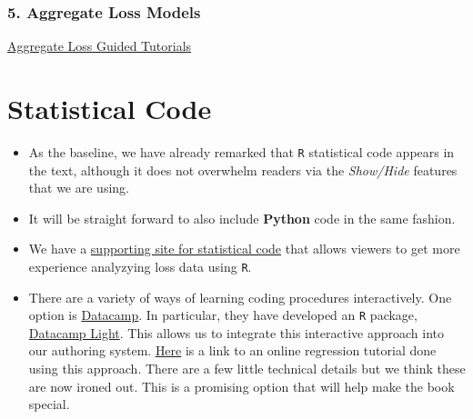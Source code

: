 \documentclass[
]{book}
\begin{document}
\hypertarget{aggregate-loss-models}{%
\subsection{5. Aggregate Loss Models}\label{aggregate-loss-models}}

\href{https://www.ssc.wisc.edu/~jfrees/loss-data-analytics/aggregate-loss-guided-tutorials/}{Aggregate Loss Guided Tutorials}

\hypertarget{S:StatisticalCode}{%
\chapter{Statistical Code}\label{S:StatisticalCode}}

\begin{itemize}
\item
  As the baseline, we have already remarked that \texttt{R} statistical code appears in the text, although it does not overwhelm readers via the \emph{Show/Hide} features that we are using.
\item
  It will be straight forward to also include \textbf{Python} code in the same fashion.
\item
  We have a \href{https://ewfrees.github.io/LDARcode/index.html}{supporting site for statistical code} that allows viewers to get more experience analyzying loss data using \texttt{R}.
\item
  There are a variety of ways of learning coding procedures interactively. One option is \href{https://www.datacamp.com}{Datacamp}. In particular, they have developed an \texttt{R} package, \href{https://support.datacamp.com/hc/en-us/articles/360007749853-What-is-DataCamp-Light-}{Datacamp Light}. This allows us to integrate this interactive approach into our authoring system. \href{https://ewfreesres.github.io/RegressModel/index.html}{Here} is a link to an online regression tutorial done using this approach. There are a few little technical details but we think these are now ironed out. This is a promising option that will help make the book special.
\end{itemize}
\end{document}

